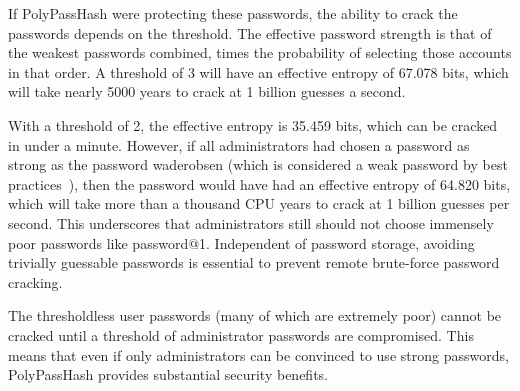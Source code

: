 If PolyPassHash were protecting these passwords, the ability to crack the
passwords depends on the threshold.   The effective password strength is 
that of the weakest passwords combined, times the probability of selecting
those accounts in that order.  
A threshold of 3 will have an effective entropy of 67.078 bits,
which will take nearly 5000 years to crack at 1 billion guesses a second. 

With a threshold of 2, the effective entropy
is 35.459 bits, which can be cracked in under a minute.   
However, if all administrators had chosen a password
as strong as the password waderobsen (which is considered a weak
password by best practices~\cite{passwordlength}), then the password would 
have had an effective 
entropy of 64.820 bits, which will take more than a thousand CPU years to crack
at 1 billion guesses per second.   This underscores that administrators
still should not choose immensely poor passwords like password@1.   
Independent of password storage, avoiding trivially guessable passwords 
is essential to prevent remote brute-force password cracking.

The thresholdless user passwords (many of which are extremely poor) 
cannot be cracked until a threshold of administrator passwords are 
compromised.  This means that even if only administrators can be convinced to 
use strong passwords, PolyPassHash provides substantial security benefits.





